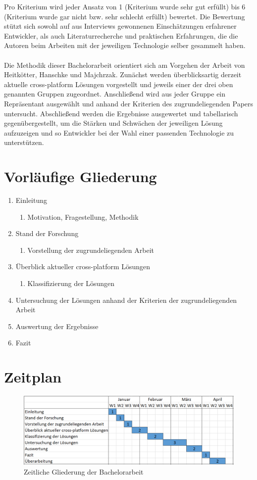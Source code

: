 Pro Kriterium wird jeder Ansatz von 1 (Kriterium wurde sehr gut erfüllt) bis 6 (Kriterium wurde gar nicht bzw. sehr schlecht erfüllt) bewertet. Die Bewertung stützt sich sowohl auf aus Interviews gewonnenen Einschätzungen erfahrener Entwickler, als auch Literaturrecherche und praktischen Erfahrungen, die die Autoren beim Arbeiten mit der jeweiligen Technologie selber gesammelt haben.\\ \\
Die Methodik dieser Bachelorarbeit orientiert sich am Vorgehen der Arbeit von Heitkötter, Hanschke und Majchrzak. Zunächst werden überblicksartig derzeit aktuelle cross-platform Lösungen vorgestellt und jeweils einer der drei oben genannten Gruppen zugeordnet. Anschließend wird aus jeder Gruppe ein Repräsentant ausgewählt und anhand der Kriterien des zugrundeliegenden Papers untersucht. Abschließend werden die Ergebnisse ausgewertet und tabellarisch gegenübergestellt, um die Stärken und Schwächen der jeweiligen Lösung aufzuzeigen und so Entwickler bei der Wahl einer passenden Technologie zu unterstützen.
\\
\section*{Vorläufige Gliederung}

\begin{enumerate}
\item Einleitung
\begin{enumerate}[label*=\arabic*.]
\item Motivation, Fragestellung, Methodik
\end{enumerate}
\item Stand der Forschung
\begin{enumerate}[label*=\arabic*.]
\item Vorstellung der zugrundeliegenden Arbeit
\end{enumerate}
\item Überblick aktueller cross-platform Lösungen
\begin{enumerate}[label*=\arabic*.]
\item Klassifizierung der Lösungen
\end{enumerate}
\item Untersuchung der Lösungen anhand der Kriterien der zugrundeliegenden Arbeit
\item Auswertung der Ergebnisse
\item Fazit 
\end{enumerate}

 \section*{Zeitplan}
 \begin{figure}[H]
	\renewcommand*\figurename{Abbildung}
		\begin{center}
			\includegraphics[width=1\textwidth]{timetable.png}
		\end{center}
		\caption{Zeitliche Gliederung der Bachelorarbeit}
	\end{figure}